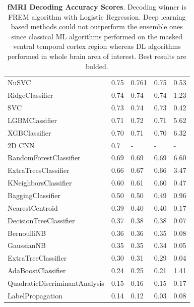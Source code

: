 \documentclass[10pt, twocolumn, letterpaper]{article}
\begin{document}
\begin{table}[]
\begin{tabular}{l|llll}
NuSVC &
  \multicolumn{1}{l|}{0.75} &
  \multicolumn{1}{l|}{0.761} &
  \multicolumn{1}{l|}{0.75} &
  0.53 \\
RidgeClassifier &
  \multicolumn{1}{l|}{0.74} &
  \multicolumn{1}{l|}{0.74} &
  \multicolumn{1}{l|}{0.74} &
  1.23 \\
SVC &
  \multicolumn{1}{l|}{0.73} &
  \multicolumn{1}{l|}{0.74} &
  \multicolumn{1}{l|}{0.73} &
  0.42 \\
LGBMClassifier &
  \multicolumn{1}{l|}{0.71} &
  \multicolumn{1}{l|}{0.72} &
  \multicolumn{1}{l|}{0.71} &
  5.62 \\
XGBClassifier &
  \multicolumn{1}{l|}{0.70} &
  \multicolumn{1}{l|}{0.71} &
  \multicolumn{1}{l|}{0.70} &
  6.32 \\
2D CNN &
  \multicolumn{1}{l|}{0.7} &
  \multicolumn{1}{l|}{-} &
  \multicolumn{1}{l|}{-} &
  - \\
RandomForestClassifier &
  \multicolumn{1}{l|}{0.69} &
  \multicolumn{1}{l|}{0.69} &
  \multicolumn{1}{l|}{0.69} &
  6.60 \\
ExtraTreesClassifier &
  \multicolumn{1}{l|}{0.66} &
  \multicolumn{1}{l|}{0.67} &
  \multicolumn{1}{l|}{0.66} &
  3.47 \\
KNeighborsClassifier &
  \multicolumn{1}{l|}{0.60} &
  \multicolumn{1}{l|}{0.61} &
  \multicolumn{1}{l|}{0.60} &
  0.47 \\
BaggingClassifier &
  \multicolumn{1}{l|}{0.50} &
  \multicolumn{1}{l|}{0.50} &
  \multicolumn{1}{l|}{0.49} &
  0.96 \\
NearestCentroid &
  \multicolumn{1}{l|}{0.39} &
  \multicolumn{1}{l|}{0.40} &
  \multicolumn{1}{l|}{0.40} &
  0.17 \\
DecisionTreeClassifier &
  \multicolumn{1}{l|}{0.37} &
  \multicolumn{1}{l|}{0.38} &
  \multicolumn{1}{l|}{0.38} &
  0.07 \\
BernoulliNB &
  \multicolumn{1}{l|}{0.36} &
  \multicolumn{1}{l|}{0.36} &
  \multicolumn{1}{l|}{0.35} &
  0.08 \\
GaussianNB &
  \multicolumn{1}{l|}{0.35} &
  \multicolumn{1}{l|}{0.35} &
  \multicolumn{1}{l|}{0.34} &
  0.05 \\
ExtraTreeClassifier &
  \multicolumn{1}{l|}{0.30} &
  \multicolumn{1}{l|}{0.31} &
  \multicolumn{1}{l|}{0.29} &
  0.04 \\
AdaBoostClassifier &
  \multicolumn{1}{l|}{0.24} &
  \multicolumn{1}{l|}{0.25} &
  \multicolumn{1}{l|}{0.21} &
  1.41 \\
QuadraticDiscriminantAnalysis &
  \multicolumn{1}{l|}{0.15} &
  \multicolumn{1}{l|}{0.16} &
  \multicolumn{1}{l|}{0.15} &
  0.17 \\
LabelPropagation &
  \multicolumn{1}{l|}{0.14} &
  \multicolumn{1}{l|}{0.12} &
  \multicolumn{1}{l|}{0.03} &
  0.08 
\end{tabular}
\caption{\label{tab:results} \textbf{fMRI Decoding Accuracy Scores}. Decoding winner is FREM algorithm with Logistic Regression. Deep learning based methods could not outperform the ensemble ones since classical ML algorithms performed on the masked ventral temporal cortex region whereas DL algorithms performed in whole brain area of interest. Best results are bolded.}
\end{table}
\end{document}
